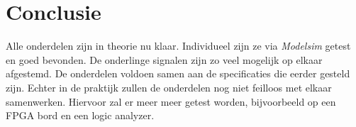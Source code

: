 \chapter{Conclusie}

Alle onderdelen zijn in theorie nu klaar. Individueel zijn ze via \emph{Modelsim} getest en goed bevonden. De onderlinge signalen zijn zo veel mogelijk op elkaar afgestemd. De onderdelen voldoen samen aan de specificaties die eerder gesteld zijn. Echter in de praktijk zullen de onderdelen nog niet feilloos met elkaar samenwerken. Hiervoor zal er meer meer getest worden, bijvoorbeeld op een FPGA bord en een logic analyzer.
% 
